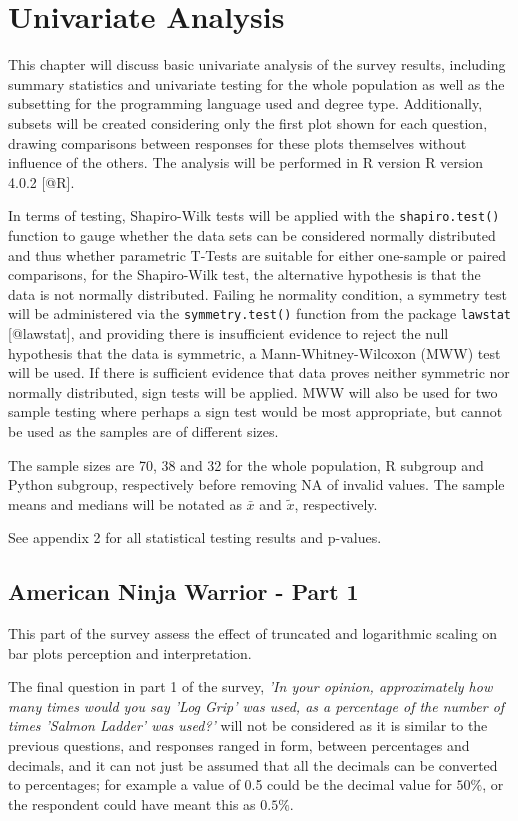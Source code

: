 \documentclass[
]{article}
\author{}
\date{\vspace{-2.5em}}
\begin{document}
\chapter{Univariate Analysis}

This chapter will discuss basic univariate analysis of the survey
results, including summary statistics and univariate testing for the
whole population as well as the subsetting for the programming language
used and degree type. Additionally, subsets will be created considering
only the first plot shown for each question, drawing comparisons between
responses for these plots themselves without influence of the others.
The analysis will be performed in R version R version 4.0.2 {[}@R{]}.

In terms of testing, Shapiro-Wilk tests will be applied with the
\texttt{shapiro.test()} function to gauge whether the data sets can be
considered normally distributed and thus whether parametric T-Tests are
suitable for either one-sample or paired comparisons, for the
Shapiro-Wilk test, the alternative hypothesis is that the data is not
normally distributed. Failing he normality condition, a symmetry test
will be administered via the \texttt{symmetry.test()} function from the
package \texttt{lawstat} {[}@lawstat{]}, and providing there is
insufficient evidence to reject the null hypothesis that the data is
symmetric, a Mann-Whitney-Wilcoxon (MWW) test will be used. If there is
sufficient evidence that data proves neither symmetric nor normally
distributed, sign tests will be applied. MWW will also be used for two
sample testing where perhaps a sign test would be most appropriate, but
cannot be used as the samples are of different sizes.

The sample sizes are 70, 38 and 32 for the whole population, R subgroup
and Python subgroup, respectively before removing NA of invalid values.
The sample means and medians will be notated as \(\bar{x}\) and
\(\tilde{x}\), respectively.

See appendix 2 for all statistical testing results and p-values.

\section{American Ninja Warrior - Part 1}

This part of the survey assess the effect of truncated and logarithmic
scaling on bar plots perception and interpretation.

The final question in part 1 of the survey,
\textit{'In your opinion, approximately how many times would you say 'Log Grip' was used, as a percentage of the number of times 'Salmon Ladder' was used?'}
will not be considered as it is similar to the previous questions, and
responses ranged in form, between percentages and decimals, and it can
not just be assumed that all the decimals can be converted to
percentages; for example a value of 0.5 could be the decimal value for
\(50\%\), or the respondent could have meant this as \(0.5\%\).
\end{document}

